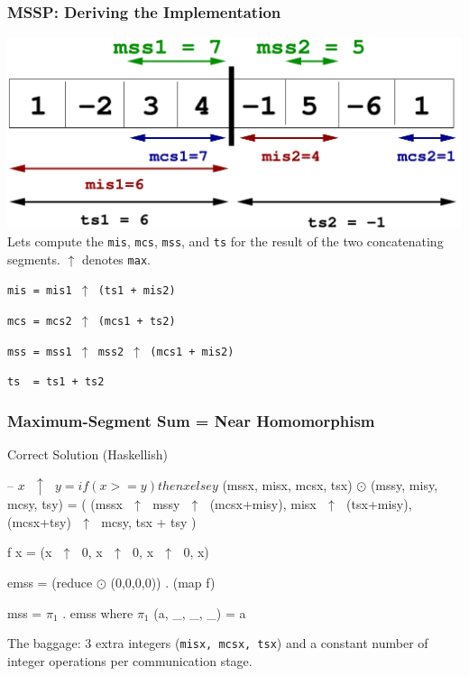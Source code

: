 \documentclass{beamer}
\renewcommand{\emph}[1]{\textcolor{structure}{#1}}
\newcommand{\emp}[1]{\textcolor{DikuRed}{ #1}}
\newcommand{\mymath}[1]{$ #1 $}
\newcommand{\myindx}[1]{_{#1}}
\begin{document}
\begin{frame}[fragile,t]
  \frametitle{MSSP: Deriving the Implementation}

\includegraphics[height=22ex]{Figures/L1/mssp2}
\medskip
Lets compute the {\tt mis}, {\tt mcs}, {\tt mss}, and {\tt ts} for
the result of the two concatenating segments. $\uparrow$ denotes {\tt max}.

\bigskip
{\tt mis = \pause mis1 $\uparrow$ (ts1 + mis2)}
\medskip

{\tt mcs = \pause mcs2 $\uparrow$ (mcs1 + ts2)}
\medskip

{\tt mss = \pause mss1 $\uparrow$ mss2 $\uparrow$ (mcs1 + mis2)}
\medskip

{\tt ts~~= ts1 + ts2}
\end{frame}


\begin{frame}[fragile,t]
  \frametitle{Maximum-Segment Sum = Near Homomorphism}

\begin{block}{Correct Solution (Haskellish)}
\begin{colorcode}
-- \mymath{x\mbox{ }\uparrow\mbox{ }y = if(x >= y) then x else y}
(mssx, misx, mcsx, tsx) \mymath{\odot} (mssy, misy, mcsy, tsy) = (
        (mssx\mymath{\mbox{ }\uparrow\mbox{ }}mssy\mymath{\mbox{ }\uparrow\mbox{ }}(mcsx+misy),
         misx\mymath{\mbox{ }\uparrow\mbox{ }}(tsx+misy),
        (mcsx+tsy)\mymath{\mbox{ }\uparrow\mbox{ }}mcsy,
         tsx + tsy
    )

f x = (x\mymath{\mbox{ }\uparrow\mbox{ }}0, x\mymath{\mbox{ }\uparrow\mbox{ }}0, x\mymath{\mbox{ }\uparrow\mbox{ }}0, x)

\emph{emss = (reduce \mymath{\odot} (0,0,0,0)) . (map f)}

\emp{mss  = \mymath{\pi\myindx{1}} . emss}
       where \mymath{\pi\myindx{1}} (a, _, _, _) = a 
\end{colorcode}
\end{block} 

\smallskip

The baggage: $3$ extra integers ({\tt misx, mcsx, tsx}) 
and a constant number of integer operations per communication stage. 


\end{frame}
\end{document}
